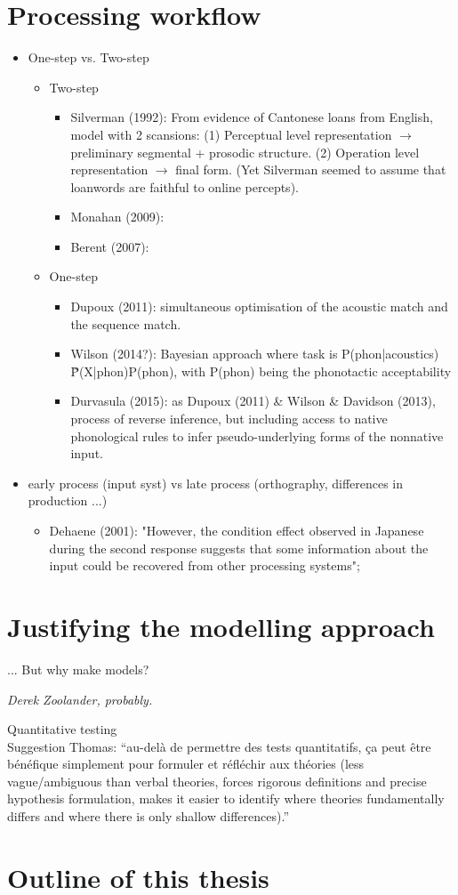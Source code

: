 \section{Processing workflow}
\begin{itemize}
\item One-step vs. Two-step
  \begin{itemize}
  \item Two-step
      \begin{itemize}
        \item Silverman (1992): From evidence of Cantonese loans from English, model with 2 scansions: (1) Perceptual level representation $\rightarrow$ preliminary segmental + prosodic structure. (2) Operation level representation $\rightarrow$ final form. (Yet Silverman seemed to assume that loanwords are faithful to online percepts).
        \item Monahan (2009):
        \item Berent (2007): 
      \end{itemize}
  \item One-step
      \begin{itemize}
         \item Dupoux (2011): simultaneous optimisation of the acoustic match and the sequence match.
         \item Wilson (2014?): Bayesian approach where task is P(phon|acoustics) \~ P(X|phon)P(phon), with P(phon) being the phonotactic acceptability 
         \item Durvasula (2015): as Dupoux (2011) \& Wilson \& Davidson (2013), process of reverse inference, but including access to native phonological rules to infer pseudo-underlying forms of the nonnative input.
      \end{itemize}  
  \end{itemize}
\item early process (input syst) vs late process (orthography, differences in production ...)
  \begin{itemize}
     \item Dehaene (2001): "However, the condition effect observed in Japanese during the second response suggests that some information about the input could be recovered from other processing systems";
  \end{itemize}  
\end{itemize}
    
\section{Justifying the modelling approach}
\epigraph{... But why make models?}{\textit{Derek Zoolander, probably.}}
Quantitative testing $~$ \\
Suggestion Thomas: ``au-delà de permettre des tests quantitatifs, ça peut être bénéfique simplement pour formuler et réfléchir aux théories (less vague/ambiguous than verbal theories, forces rigorous definitions and precise hypothesis formulation, makes it easier to identify where theories fundamentally differs and where there is only shallow differences).''
\section{Outline of this thesis}

